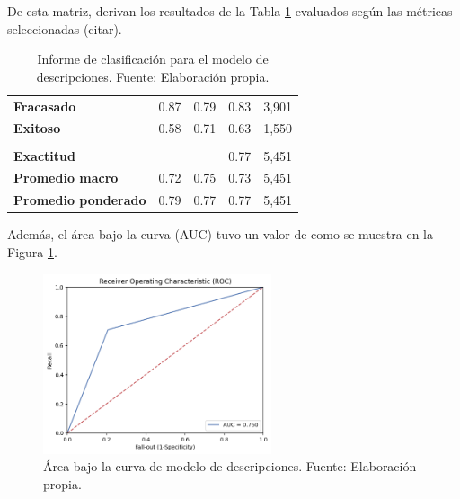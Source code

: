 De esta matriz, derivan los resultados de la Tabla \ref{5:table2} evaluados según las métricas seleccionadas (citar).

\begin{table}[h!]
	\centering
	\small
	\begin{tabular}{ |m{4.5cm}|m{2.5cm}|m{2.5cm}|m{2.5cm}|m{2.5cm}|  }
		\hline
		\rowcolor{bluejean}
		\Centering \color{white}{Valor}& \Centering \color{white}{Precisión}& \Centering \color{white}{Sensibilidad}& \Centering \color{white}{Puntaje F1}& \Centering \color{white}{Muestras}\\
		\hline
		\textbf{Fracasado} & 0.87 & 0.79 & 0.83 & 3,901 \\
		\hline
		\textbf{Exitoso} & 0.58 & 0.71 & 0.63 & 1,550 \\
		\hline
		\rowcolor{turq}
		\multicolumn{5}{c}{ } \\
		\hline
		\textbf{Exactitud} &  &	 & 0.77 & 5,451 \\
		\hline
		\textbf{Promedio macro} & 0.72 & 0.75 & 0.73 & 5,451 \\
		\hline
		\textbf{Promedio ponderado} & 0.79 & 0.77 & 0.77 & 5,451 \\
		\hline
	\end{tabular}
	\caption{Informe de clasificación para el modelo de descripciones. Fuente: Elaboración propia.}
	\label{5:table2}
\end{table}

Además, el área bajo la curva (AUC) tuvo un valor de como se muestra en la Figura \ref{5:fig8}.

\begin{figure}[!ht]
	\begin{center}
		\includegraphics[width=0.60\textwidth]{4/figures/description_auc.png}
		\caption{Área bajo la curva de modelo de descripciones. Fuente: Elaboración propia.}
		\label{5:fig8}
	\end{center}
\end{figure}

